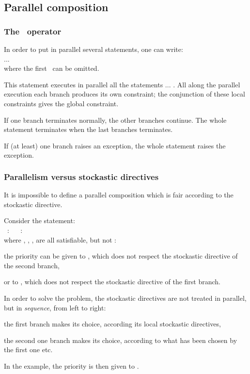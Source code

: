 \subsection{Parallel composition}

\subsubsection{The \ES\ operator}

In order to put in parallel several statements, one can write:\\
\OB \ES {} \ES ... \ES {} \CB\\
where the first \ES\ can be omitted.

This  statement executes  in  parallel all  the statements  
... .  All along the parallel execution each branch produces
its own  constraint; the conjunction of these  local constraints gives
the global constraint.

If one branch terminates  normally, the other branches continue.  The
whole statement terminates when the last branches terminates.

If (at  least) one  branch raises an  exception, the  whole statement
raises the exception.


\subsubsection{Parallelism versus stockastic directives}


It  is impossible  to define  a  parallel composition  which is  fair
according to the stockastic directive.


\begin{example}
Consider the statement:\\ 
\OB~\OB {}:  \BAR {} \CB
~\ES~
\OB {}:   \BAR {} \CB
~\CB\\
where , , ,  are all
satisfiable, but not :
\begin{minitemize}
\item the priority can be given to , which 
does not respect the stockastic directive of the second branch,
\item or to , which
does not respect the stockastic directive of the first branch.
\end{minitemize}
\end{example}
In order to solve the problem, the stockastic directives are not
treated in parallel, but in {\em sequence}, from left to right:
\begin{minitemize}
\item the first branch makes its choice, according its local
stockastic directives, 
\item the second one  branch makes its choice, according to what has
been chosen by the first one etc. 
\end{minitemize}
In the example, the priority is then given to
. 

